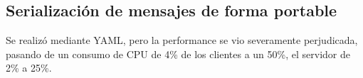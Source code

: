 \subsection{Serialización de mensajes de forma portable}

Se realizó mediante YAML, pero la performance se vio severamente perjudicada, pasando de un consumo de CPU de 4\% de los clientes a un 50\%, el servidor de 2\% a 25\%.
